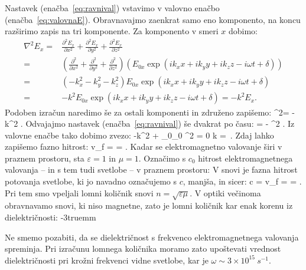 Nastavek 
(enačba~\ref{eq:ravnival}) vstavimo v valovno enačbo (enačba~\ref{eq:valovnaE}). 
Obravnavajmo zaenkrat samo eno komponento, na koncu razširimo zapis na tri komponente. 
Za komponento v smeri $x$ dobimo:
\begin{align}
\nabla^2E_x =& \frac{\partial^2E_x}{\partial x^2} + \frac{\partial^2E_x}{\partial y^2} + 
\frac{\partial^2E_x}{\partial z^2} \nonumber \\
=& \left(\frac{\partial^2}{\partial x^2} + 
\frac{\partial^2}{\partial y^2} + \frac{\partial^2}{\partial z^2}\right) \left(
E_{0x} \exp\left( ik_xx+ik_yy+ik_zz -i\omega t + \delta\right) \right)\nonumber \\
=& \left( -k_x^2 -k_y^2-k_z^2\right) E_{0x} \exp\left( ik_xx+ik_yy+ik_zz -i\omega t + \delta\right)\nonumber \\
=& -k^2 E_{0x} \exp\left( ik_xx+ik_yy+ik_zz -i\omega t + \delta\right) = -k^2 E_x.
\label{eq:03_11}
\end{align}
Podoben izračun naredimo še za ostali komponenti in združeno zapišemo:
\beq
\nabla^2= -k^2 .
\label{eq:03_12}
\eeq
Odvajajmo nastavek (enačba~\ref{eq:ravnival}) še dvakrat po času:
\beq
{} = - \omega^2 .
\label{eq:03_13}
\eeq
Iz valovne enačbe tako dobimo zvezo:
\beq
-k^2  + \varepsilon\varepsilon_0\mu\mu_0 \omega^2  = 0
\quad \Longrightarrow \quad
k = \,\omega.
\label{eq:03_15}
\eeq
Zdaj lahko zapišemo fazno hitrost:
\beq
v_f =  = .
\label{eq:fazna}
\eeq
Kadar se elektromagnetno valovanje širi v praznem prostoru, sta $\varepsilon = 1$ in $\mu=1$. 
Označimo s $c_0$ hitrost elektromagnetnega valovanja -- in s tem tudi svetlobe -- v praznem prostoru:
V snovi je fazna hitrost potovanja svetlobe, ki jo navadno označujemo s $c$, manjša, in sicer:
\beq
c = v_f =  = .
\label{eq:03_16}
\eeq
Pri tem smo vpeljali lomni količnik snovi $n = \sqrt{\varepsilon\mu}$. 
V optiki večinoma obravnavamo snovi, ki niso magnetne, zato je lomni količnik kar
enak korenu iz dielektričnosti:
\vglue-3truemm
\begin{remark}
Ne smemo pozabiti, da se dielektričnost s frekvenco elektromagnetnega 
valovanja spreminja. Pri izračunu lomnega količnika moramo zato upoštevati vrednost
dielektričnosti pri krožni frekvenci vidne svetlobe, kar je $\omega \sim 3 \times 10^{15}~\si{s}^{-1}$. 
\end{remark}

